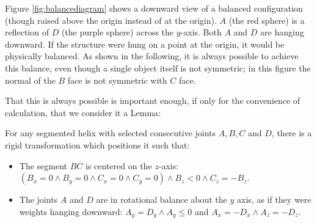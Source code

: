 \documentclass{svproc}
\newenvironment{sketch}{%
  \renewcommand{\proofname}{Proof Sketch}\proof}{\endproof}
\begin{document}
Figure \ref{fig:balancediagram} shows a downward view of a
balanced configuration (though raised above the origin
instead of at the origin).
$A$ (the red sphere) is a reflection of $D$ (the purple sphere) across
the $y$-axis.
Both $A$ and $D$ are hanging downward.
If the structure were hung on a point at the origin, it would
be physically balanced.
As shown in the following, it is always possible to achieve this balance,
even though a single object
itself is not symmetric; in this figure the normal of the $B$ face is not symmetric with $C$ face.

That this is always possible is important enough, if only for
the convenience of calculation, that we consider it a Lemma:
\begin{lemma}
  For any segmented helix with selected consecutive joints $A,B,C$ and $D$,
  there is a rigid transformation which positions it such that:
  \begin{itemize}
  \item The segment $BC$ is centered on the $z$-axis:
    $(B_x = 0 \wedge B_y = 0 \wedge C_x = 0 \wedge C_y = 0)
    \wedge B_z < 0 \wedge C_z = -B_z$.
  \item The joints $A$ and $D$ are in rotational balance about
    the $y$ axis, as if they were weights hanging downward:
    $A_y = D_y \wedge A_y \leq 0 $ and
    $A_x = -D_x \wedge A_z = -D_z$.
  \end{itemize}
  \label{lem:balance}
\end{lemma}




\end{document}
